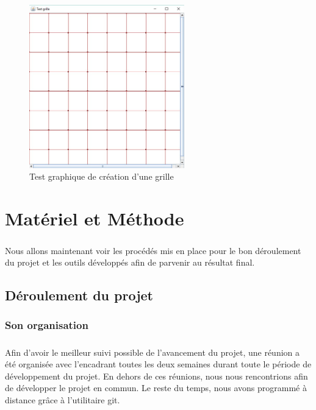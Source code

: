 \documentclass[pidr]{tnreport}
\begin{document}
\begin{figure}[H]
	\centering
    \includegraphics[width=0.6\textwidth]{./figures/ac_grille.jpg}
    \caption{Test graphique de création d'une grille}
\end{figure}

\clearpage

\chapter{Matériel et Méthode}

\paragraph{}
Nous allons maintenant voir les procédés mis en place pour le bon déroulement du projet et les outils développés afin de parvenir au résultat final.

	\section{Déroulement du projet}

		\subsection{Son organisation}

\paragraph{}
Afin d'avoir le meilleur suivi possible de l'avancement du projet, une réunion a été organisée avec l'encadrant toutes les deux semaines durant toute le période de développement du projet. En dehors de ces réunions, nous nous rencontrions afin de développer le projet en commun. Le reste du temps, nous avons programmé à distance grâce à l'utilitaire git.
\end{document}
